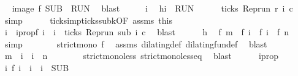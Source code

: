 \begin{isabellebody}
\ \isamarkupfalse%
\ {\isacartoucheopen}image\ f\ {\isacharquery}SUB\ {\isasymsubseteq}\ {\isacharquery}RUN{\isacartoucheclose}\ \isamarkupfalse%
\ blast\isanewline
{}\isamarkupfalse%
\isanewline
\ \ \isacommand{{\isacharbraceleft}}\isamarkupfalse%
\ \isamarkupfalse%
\ i\ \isamarkupfalse%
\ h{\isacharcolon}{\isacartoucheopen}i\ {\isasymin}\ {\isacharquery}RUN{\isacartoucheclose}\isanewline
\ \ \ \ \isamarkupfalse%
\ {\isacartoucheopen}ticks\ {\isacharparenleft}{\isacharparenleft}Rep{\isacharunderscore}run\ r{\isacharparenright}\ i\ c{\isacharparenright}{\isacartoucheclose}\ \isamarkupfalse%
\ simp\isanewline
\ \ \ \ \isamarkupfalse%
\ ticks{\isacharunderscore}imp{\isacharunderscore}ticks{\isacharunderscore}subk{\isacharbrackleft}OF\ assms\ this{\isacharbrackright}\isanewline
\ \ \ \ \ \ \isamarkupfalse%
\ i\ \ i{}prop{\isacharcolon}{\isacartoucheopen}f\ i\ {\isacharequal}\ i\ {\isasymand}\ ticks\ {\isacharparenleft}{\isacharparenleft}Rep{\isacharunderscore}run\ sub{\isacharparenright}\ i\ c{\isacharparenright}{\isacartoucheclose}\ \isamarkupfalse%
\ blast\isanewline
\ \ \ \ \isamarkupfalse%
\ h\ \isamarkupfalse%
\ {\isacartoucheopen}f\ m\ {\isasymle}\ f\ i\ {\isasymand}\ f\ i\ {\isacharless}\ f\ n{\isacartoucheclose}\ \isamarkupfalse%
\ simp\isanewline
\ \ \ \ \isamarkupfalse%
\ \isamarkupfalse%
\ {\isacartoucheopen}strict{\isacharunderscore}mono\ f{\isacartoucheclose}\ \isamarkupfalse%
\ assms\ dilating{\isacharunderscore}def\ dilating{\isacharunderscore}fun{\isacharunderscore}def\ \isamarkupfalse%
\ blast\isanewline
\ \ \ \ \isamarkupfalse%
\ \isamarkupfalse%
\ {\isacartoucheopen}m\ {\isasymle}\ i\ {\isasymand}\ i\ {\isacharless}\ n{\isacartoucheclose}\isanewline
\ \ \ \ \ \ \isamarkupfalse%
\ strict{\isacharunderscore}mono{\isacharunderscore}less\ strict{\isacharunderscore}mono{\isacharunderscore}less{\isacharunderscore}eq\ \isamarkupfalse%
\ blast\isanewline
\ \ \ \ \isamarkupfalse%
\ i{}prop\ \isamarkupfalse%
\ {\isacartoucheopen}{\isasymexists}i\ f\ i\ {\isacharequal}\ i\ {\isasymand}\ i\ {\isasymin}\ {\isacharquery}SUB{\isacartoucheclose}\ \isamarkupfalse%

\end{isabellebody}
